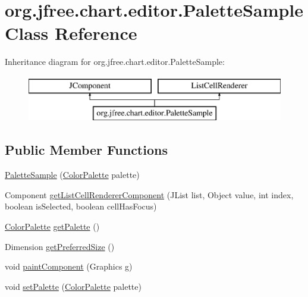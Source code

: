 \hypertarget{classorg_1_1jfree_1_1chart_1_1editor_1_1_palette_sample}{}\section{org.\+jfree.\+chart.\+editor.\+Palette\+Sample Class Reference}
\label{classorg_1_1jfree_1_1chart_1_1editor_1_1_palette_sample}
Inheritance diagram for org.\+jfree.\+chart.\+editor.\+Palette\+Sample\+:\begin{figure}[H]
\begin{center}
\leavevmode
\includegraphics[height=2.000000cm]{classorg_1_1jfree_1_1chart_1_1editor_1_1_palette_sample}
\end{center}
\end{figure}
\subsection*{Public Member Functions}
\begin{DoxyCompactItemize}
\item 
\mbox{\hyperlink{classorg_1_1jfree_1_1chart_1_1editor_1_1_palette_sample_a6ea5f8347a3519fdfc19c9f5ebce4019}{Palette\+Sample}} (\mbox{\hyperlink{classorg_1_1jfree_1_1chart_1_1plot_1_1_color_palette}{Color\+Palette}} palette)
\item 
Component \mbox{\hyperlink{classorg_1_1jfree_1_1chart_1_1editor_1_1_palette_sample_a8218550f912f608ba7f0b2add8472070}{get\+List\+Cell\+Renderer\+Component}} (J\+List list, Object value, int index, boolean is\+Selected, boolean cell\+Has\+Focus)
\item 
\mbox{\hyperlink{classorg_1_1jfree_1_1chart_1_1plot_1_1_color_palette}{Color\+Palette}} \mbox{\hyperlink{classorg_1_1jfree_1_1chart_1_1editor_1_1_palette_sample_a0cd057c4cf2fb1e43b00b27d8b304c03}{get\+Palette}} ()
\item 
Dimension \mbox{\hyperlink{classorg_1_1jfree_1_1chart_1_1editor_1_1_palette_sample_a775267007db10799e8f6c44b6ff4a70e}{get\+Preferred\+Size}} ()
\item 
void \mbox{\hyperlink{classorg_1_1jfree_1_1chart_1_1editor_1_1_palette_sample_a92e69e17d2f9806601c871dd116690b7}{paint\+Component}} (Graphics g)
\item 
void \mbox{\hyperlink{classorg_1_1jfree_1_1chart_1_1editor_1_1_palette_sample_a55a8fa2faf2e6839f9e7725752551af2}{set\+Palette}} (\mbox{\hyperlink{classorg_1_1jfree_1_1chart_1_1plot_1_1_color_palette}{Color\+Palette}} palette)
\end{DoxyCompactItemize}


